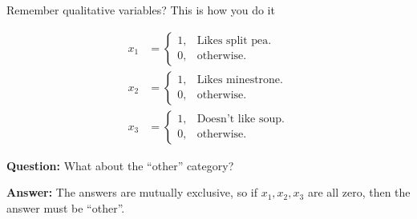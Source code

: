 \documentclass[aspectratio=169]{beamer}
\begin{document}
\begin{frame}{Remember qualitative variables?  This is how you do it}

\begin{align*}
x_1 &=\begin{cases}
    1, & \text{Likes split pea}.\\
    0, & \text{otherwise}.
  \end{cases}\\
x_2 &=\begin{cases}
    1, & \text{Likes minestrone}.\\
    0, & \text{otherwise}.
  \end{cases} \\
x_3 &=\begin{cases}
    1, & \text{Doesn't like soup}.\\
    0, & \text{otherwise}.
  \end{cases}  
\end{align*}
 
  \textbf{Question:} What about the ``other'' category?  
  
  \textbf{Answer: } The answers are mutually exclusive, so if $x_1, x_2, x_3$ are all zero, then the answer must be ``other''.

\end{frame}
\end{document}
